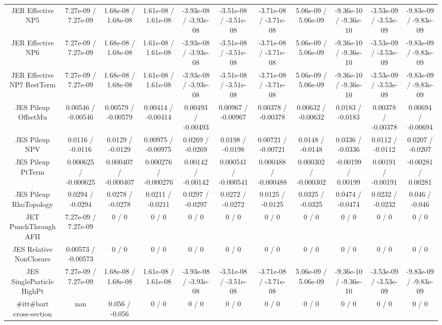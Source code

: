 \begin{table}[htbp]
\begin{center}
\begin{tabular}{|c|c|c|c|c|c|c|c|c|c|c|}
  JER Effective NP5 & 7.27e-09 / 7.27e-09 & 1.68e-08 / 1.68e-08 & 1.61e-08 / 1.61e-08 & -3.93e-08 / -3.93e-08 & -3.51e-08 / -3.51e-08 & -3.71e-08 / -3.71e-08 & 5.06e-09 / 5.06e-09 & -9.36e-10 / -9.36e-10 & -3.53e-09 / -3.53e-09 & -9.83e-09 / -9.83e-09 \\ 
  JER Effective NP6 & 7.27e-09 / 7.27e-09 & 1.68e-08 / 1.68e-08 & 1.61e-08 / 1.61e-08 & -3.93e-08 / -3.93e-08 & -3.51e-08 / -3.51e-08 & -3.71e-08 / -3.71e-08 & 5.06e-09 / 5.06e-09 & -9.36e-10 / -9.36e-10 & -3.53e-09 / -3.53e-09 & -9.83e-09 / -9.83e-09 \\ 
  JER Effective NP7 RestTerm & 7.27e-09 / 7.27e-09 & 1.68e-08 / 1.68e-08 & 1.61e-08 / 1.61e-08 & -3.93e-08 / -3.93e-08 & -3.51e-08 / -3.51e-08 & -3.71e-08 / -3.71e-08 & 5.06e-09 / 5.06e-09 & -9.36e-10 / -9.36e-10 & -3.53e-09 / -3.53e-09 & -9.83e-09 / -9.83e-09 \\ 
  JES Pileup OffsetMu & 0.00546 / -0.00546 & 0.00579 / -0.00579 & 0.00414 / -0.00414 & 0.00493 / -0.00493 & 0.00967 / -0.00967 & 0.00378 / -0.00378 & 0.00632 / -0.00632 & 0.0183 / -0.0183 & 0.00378 / -0.00378 & 0.00694 / -0.00694 \\ 
  JES Pileup NPV & 0.0116 / -0.0116 & 0.0129 / -0.0129 & 0.00975 / -0.00975 & 0.0269 / -0.0269 & 0.0198 / -0.0198 & 0.00721 / -0.00721 & 0.0148 / -0.0148 & 0.0336 / -0.0336 & 0.0112 / -0.0112 & 0.0207 / -0.0207 \\ 
  JES Pileup PtTerm & 0.000625 / -0.000625 & 0.000407 / -0.000407 & 0.000276 / -0.000276 & 0.00142 / -0.00142 & 0.000541 / -0.000541 & 0.000488 / -0.000488 & 0.000302 / -0.000302 & -0.00199 / 0.00199 & 0.00191 / -0.00191 & -0.00281 / 0.00281 \\ 
  JES Pileup RhoTopology & 0.0294 / -0.0294 & 0.0278 / -0.0278 & 0.0211 / -0.0211 & 0.0297 / -0.0297 & 0.0272 / -0.0272 & 0.0125 / -0.0125 & 0.0325 / -0.0325 & 0.0474 / -0.0474 & 0.0232 / -0.0232 & 0.046 / -0.046 \\ 
  JET PunchThrough AFII & 7.27e-09 / 7.27e-09 & 0 / 0 & 0 / 0 & 0 / 0 & 0 / 0 & 0 / 0 & 0 / 0 & 0 / 0 & 0 / 0 & 0 / 0 \\ 
  JES Relative NonClosure & 0.00573 / -0.00573 & 0 / 0 & 0 / 0 & 0 / 0 & 0 / 0 & 0 / 0 & 0 / 0 & 0 / 0 & 0 / 0 & 0 / 0 \\ 
  JES SingleParticle HighPt & 7.27e-09 / 7.27e-09 & 1.68e-08 / 1.68e-08 & 1.61e-08 / 1.61e-08 & -3.93e-08 / -3.93e-08 & -3.51e-08 / -3.51e-08 & -3.71e-08 / -3.71e-08 & 5.06e-09 / 5.06e-09 & -9.36e-10 / -9.36e-10 & -3.53e-09 / -3.53e-09 & -9.83e-09 / -9.83e-09 \\ 
  #it{t#bar{t}} cross-section &    nan    & 0.056 / -0.056 & 0 / 0 & 0 / 0 & 0 / 0 & 0 / 0 & 0 / 0 & 0 / 0 & 0 / 0 & 0 / 0 \\ 

\end{tabular}
\end{center}
\end{table}
